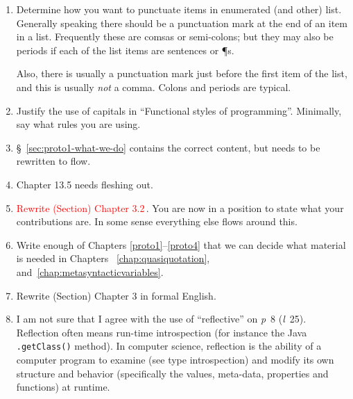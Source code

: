\begin{scope}
\begin{enumerate}
\item \label{item:5}
  Determine how you want to punctuate items in enumerated (and other)
  list.
  Generally speaking there should be a punctuation mark at the end of an
  item in a list.
  Frequently these are comsas or semi-colons; but they may also be
  periods if each of the list items are sentences or \P{}s.

  Also, there is usually a punctuation mark just before the first item
  of the list, and this is usually \textit{not} a comma.  Colons and
  periods are typical.

\item
  Justify the use of capitals in ``Functional styles of programming''.
  Minimally, say what rules you are using.
\item
  \S~\ref{sec:proto1-what-we-do} contains the correct content, but needs
  to be rewritten to flow.
\item
  Chapter 13.5 needs fleshing out.

\item
  \textcolor{red}{Rewrite (Section) Chapter 3.2}\,.
  You are now in a position to state what your contributions are.
  In some sense everything else flows around this.

\item
  Write enough of Chapters \ref{proto1}--\ref{proto4} that we can decide
  what material is needed in Chapters~ \ref{chap:quasiquotation},
  and~\ref{chap:metasyntacticvariables}.

\item
  Rewrite (Section) Chapter 3 in formal English.

\item
  I am not sure that I agree with the use of ``reflective'' on
  \textit{p}~8 (\textit{l}~25).  Reflection often means run-time
  introspection (for instance the Java \Verb!.getClass()! method).
  In computer science, reflection is the ability of a computer program to examine (see type introspection) and modify its own structure and behavior (specifically the values, meta-data, properties and functions) at runtime.
  


\end{enumerate}
\end{scope}
